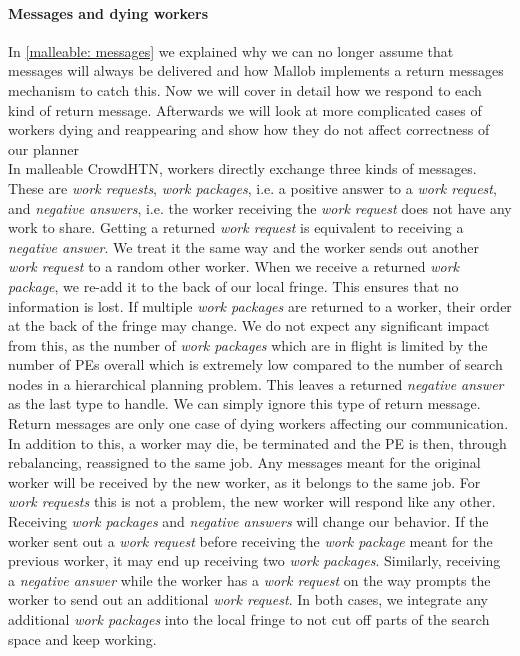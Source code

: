 \paragraph{Messages and dying workers}
\label{impl: malleable messages}
In \ref{malleable: messages} we explained why we can no longer assume that messages will always be delivered and how Mallob implements a return messages mechanism to catch this. Now we will cover in detail how we respond to each kind of return message. Afterwards we will look at more complicated cases of workers dying and reappearing and show how they do not affect correctness of our planner \\
In malleable CrowdHTN, workers directly exchange three kinds of messages. These are \textit{work requests}, \textit{work packages}, i.e. a positive answer to a \textit{work request}, and \textit{negative answers}, i.e. the worker receiving the \textit{work request} does not have any work to share.
Getting a returned \textit{work request} is equivalent to receiving a \textit{negative answer}. We treat it the same way and the worker sends out another \textit{work request} to a random other worker. When we receive a returned \textit{work package}, we re-add it to the back of our local fringe. This ensures that no information is lost. If multiple \textit{work packages} are returned to a worker, their order at the back of the fringe may change. We do not expect any significant impact from this, as the number of \textit{work packages} which are in flight is limited by the number of PEs overall which is extremely low compared to the number of search nodes in a hierarchical planning problem. This leaves a returned \textit{negative answer} as the last type to handle. We can simply ignore this type of return message. \\
Return messages are only one case of dying workers affecting our communication. In addition to this, a worker may die, be terminated and the PE is then, through rebalancing, reassigned to the same job. Any messages meant for the original worker will be received by the new worker, as it belongs to the same job. For \textit{work requests} this is not a problem, the new worker will respond like any other. Receiving \textit{work packages} and \textit{negative answers} will change our behavior. If the worker sent out a \textit{work request} before receiving the \textit{work package} meant for the previous worker, it may end up receiving two \textit{work packages}. Similarly, receiving a \textit{negative answer} while the worker has a \textit{work request} on the way prompts the worker to send out an additional \textit{work request}. In both cases, we integrate any additional \textit{work packages} into the local fringe to not cut off parts of the search space and keep working. 
